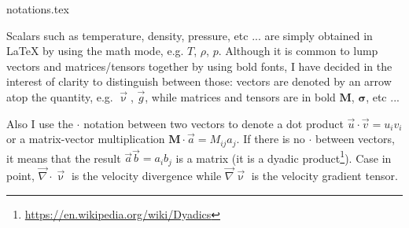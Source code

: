\begin{flushright} {\tiny {\color{gray} notations.tex}} \end{flushright}

Scalars such as temperature, density, pressure, etc ... are simply 
obtained in \LaTeX{} by using the math mode, e.g. $T$, $\rho$, $p$.
Although it is common to lump vectors and matrices/tensors together
by using bold fonts, I have decided in the interest of clarity to 
distinguish between those: vectors are denoted by an arrow 
atop the quantity, e.g. $\vec \upnu$, $\vec g$, while matrices 
and tensors are in bold $\bm M$, $\bm \sigma$, etc ...

Also I use the $\cdot$ notation between two vectors to denote a 
dot product $\vec u \cdot \vec v = u_iv_i$ or a matrix-vector
multiplication ${\bm M}\cdot \vec a = M_{ij}a_j$. If there is no
$\cdot$ between vectors, it means that the result 
$\vec a \vec b = a_ib_j$ is a matrix (it is a dyadic 
product\footnote{\url{https://en.wikipedia.org/wiki/Dyadics}}).
Case in point, $\vec\nabla\cdot\vec\upnu$ is the velocity divergence
while $\vec\nabla\vec\upnu$ is the velocity gradient tensor.
